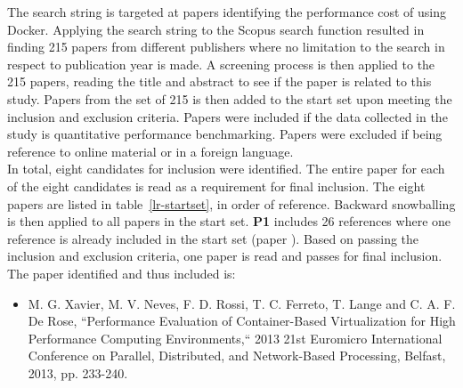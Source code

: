 The search string is targeted at papers identifying the performance cost of using Docker. Applying the search string to the Scopus search function resulted in finding 215 papers from different publishers where no limitation to the search in respect to publication year is made. A screening process is then applied to the 215 papers, reading the title and abstract to see if the paper is related to this study. Papers from the set of 215 is then added to the start set upon meeting the inclusion and exclusion criteria. Papers were included if the data collected in the study is quantitative performance benchmarking. Papers were excluded if being reference to online material or in a foreign language.\\

In total, eight candidates for inclusion were identified. The entire paper for each of the eight candidates is read as a requirement for final inclusion. The eight papers are listed in table~\ref{lr-startset}, in order of reference. Backward snowballing is then applied to all papers in the start set. \textbf{P1} includes 26 references where one reference is already included in the start set (paper \cite{p6}). Based on passing the inclusion and exclusion criteria, one paper is read and passes for final inclusion. The paper identified and thus included is:\\
\begin{itemize}
\item \cite{p9} M. G. Xavier, M. V. Neves, F. D. Rossi, T. C. Ferreto, T. Lange and C. A. F. De Rose, “Performance Evaluation of Container-Based Virtualization for High Performance Computing Environments,“ 2013 21st Euromicro International Conference on Parallel, Distributed, and Network-Based Processing, Belfast, 2013, pp. 233-240.\\
\end{itemize}

